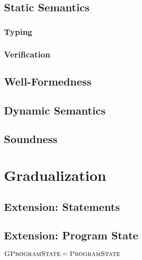     
    \subsection{Static Semantics}
    \label{sec:static-semantics}
    
        
        \subsubsection{Typing}
        \label{sssec:typing}
        
    
        \subsubsection{Verification}
        \label{sssec:verification}
        
    
    \subsection{Well-Formedness}
    \label{sec:well-formedness}
    
    
    \subsection{Dynamic Semantics}
    \label{ssec:dynamic-semantics}
    
    
    \subsection{Soundness}

\section{Gradualization}
\label{sec:cs-gradual-formulas}


    \subsection{Extension: Statements}
    \label{ssec:extension--statements}
    

    \subsection{Extension: Program State}
    $\textsc{GProgramState} = \textsc{ProgramState}$

